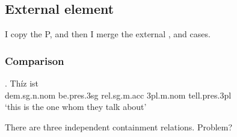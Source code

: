 \subsection{External element}

I copy the P, and then I merge the external ,  and cases.

\subsubsection{Comparison}

\exg. Thíz ist   \\
\ac{dem}.\ac{sg}.\ac{n}.\ac{nom} be.\ac{pres}.3\ac{sg}\scsub{[nom]} \ac{rel}.\ac{sg}.\ac{m}.\ac{acc} 3\ac{pl}.\ac{m}.\ac{nom} tell.\ac{pres}.3\ac{pl}\scsub{[acc]}\\
`this is the one whom they talk about' \label{ex:ohg-nom-acc-rep}

There are three independent containment relations. Problem?

